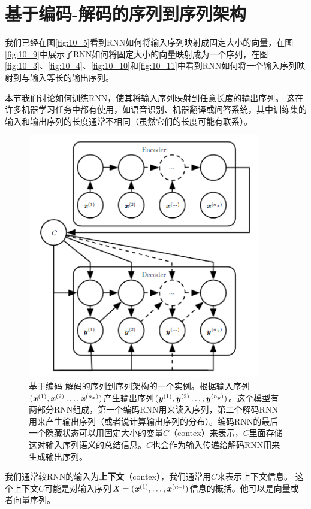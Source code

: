 \section{基于编码-解码的序列到序列架构}
\label{sec:10.4}
我们已经在图\ref{fig:10_5}看到RNN如何将输入序列映射成固定大小的向量，在图\ref{fig:10_9}中展示了RNN如何将固定大小的向量映射成为一个序列，在图\ref{fig:10_3}、\ref{fig:10_4}、\ref{fig:10_10}和\ref{fig:10_11}中看到RNN如何将一个输入序列映射到与输入等长的输出序列。

本节我们讨论如何训练RNN，使其将输入序列映射到任意长度的输出序列。
这在许多机器学习任务中都有使用，如语音识别、机器翻译或问答系统，其中训练集的输入和输出序列的长度通常不相同（虽然它们的长度可能有联系）。

\begin{figure}[htbp] %
   \centering
   \includegraphics[width=4in]{fig/chap10/10_12.PNG} 
   \caption{基于编码-解码的序列到序列架构的一个实例。根据输入序列$(\boldsymbol{\mathit{x}}^{(1)},\boldsymbol{\mathit{x}}^{(2)} \dots, \boldsymbol{\mathit{x}}^{(n_x)})$产生输出序列$(\boldsymbol{\mathit{y}}^{(1)},\boldsymbol{\mathit{y}}^{(2)} \dots, \boldsymbol{\mathit{y}}^{(n_y)})$。这个模型有两部分RNN组成，第一个编码RNN用来读入序列，第二个解码RNN用来产生输出序列（或者说计算输出序列的分布）。编码RNN的最后一个隐藏状态可以用固定大小的变量$C$（contex）来表示，$C$里面存储这对输入序列语义的总结信息。$C$也会作为输入传递给解码RNN用来生成输出序列。}
   \label{fig:10_12}
\end{figure}

我们通常较RNN的输入为\textbf{上下文}（contex），我们通常用$C$来表示上下文信息。
这个上下文$C$可能是对输入序列$\boldsymbol{\mathit{X}}=(\boldsymbol{\mathit{x}}^{(1)},\dots,\boldsymbol{\mathit{x}}^{(n_x)})$信息的概括。他可以是向量或者向量序列。

